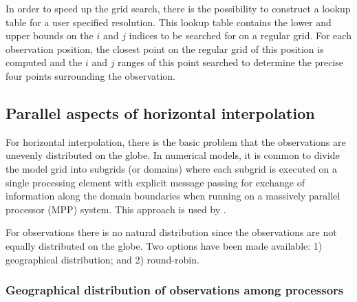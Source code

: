 In order to speed up the grid search, there is the possibility to construct 
a lookup table for a user specified resolution. This lookup
table contains the lower and upper bounds on the $i$ and $j$ indices
to be searched for on a regular grid. For each observation position,
the closest point on the regular grid of this position is computed and
the $i$ and $j$ ranges of this point searched to determine the precise
four points surrounding the observation. 

\subsection{Parallel aspects of horizontal interpolation}
\label{OBS_parallel}

For horizontal interpolation, there is the basic problem that the
observations are unevenly distributed on the globe. In numerical
models, it is common to divide the model grid into subgrids (or
domains) where each subgrid is executed on a single processing element
with explicit message passing for exchange of information along the
domain boundaries when running on a massively parallel processor (MPP)
system. This approach is used by \NEMO.

For observations there is no natural distribution since the
observations are not equally distributed on the globe. 
Two options have been made available: 1) geographical distribution;
and 2) round-robin.

\subsubsection{Geographical distribution of observations among processors}

